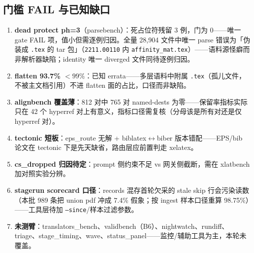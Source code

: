 \subsection{门槛 FAIL 与已知缺口}

\begin{enumerate}
  \item \textbf{dead protect ph=3}（parsebench）：死占位符残留 3 例，门为 0——唯一 gate FAIL 项，值小但需逐例归因。全量 28{,}904 文件中唯一 parse 错误为「伪装成 \texttt{.tex} 的 tar 包」（\texttt{2211.00110} 内 \texttt{affinity\_mat.tex}）——语料源怪癖而非解析器缺陷；identity 唯一 diverged 文件同待逐例归因。
  \item \textbf{flatten 93.7\% $<99\%$}：已知 errata——多层语料中附属 \texttt{.tex}（孤儿文件，不被主文档引用）不进 flatten 面的占比，口径而非缺陷。
  \item \textbf{alignbench 覆盖薄}：812 对中 765 对 named-dests 为零——保留率指标实际只在 42 个 hyperref 对上有意义，指标口径需复核（分母该是所有对还是仅 hyperref 对）。
  \item \textbf{tectonic 短板}：eps\_route 无解 + biblatex$\leftrightarrow$biber 版本错配——EPS/bib 论文在 tectonic 下是先天缺省，路由层应前置判走 xelatex。
  \item \textbf{cs\_dropped 归因待定}：prompt 侧约束不足 vs 网关侧截断，需在 xlatbench 加对照实验分辨。
  \item \textbf{stagerun scorecard 口径}：records 混存首轮欠采的 stale skip 行会污染读数（本批 989 条把 union pdf 冲成 7.4\% 假象；按 ingest 样本口径重算 98.75\%）——工具层待加 \texttt{--since}/样本过滤参数。
  \item \textbf{未测臂}：translators\_bench、validbench（B6）、nightwatch、rundiff、triage、stage\_timing、wave、status\_panel——监控/辅助工具为主，本轮未覆盖。
\end{enumerate}
